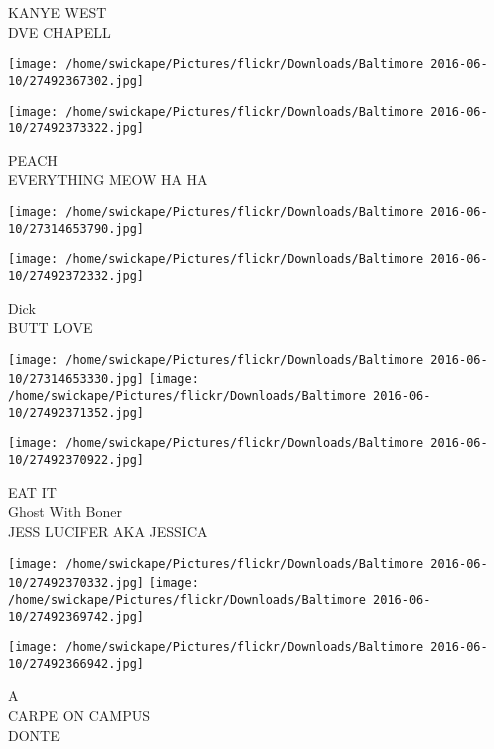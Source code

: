 \documentclass[10pt,letterpaper]{article}
\begin{document}
KANYE WEST\\
DVE CHAPELL\\
\pagebreak

\texttt{[image: /home/swickape/Pictures/flickr/Downloads/Baltimore 2016-06-10/27492367302.jpg]}

\vspace{0.25in}
\texttt{[image: /home/swickape/Pictures/flickr/Downloads/Baltimore 2016-06-10/27492373322.jpg]}

PEACH\\
EVERYTHING MEOW HA HA\\
\pagebreak

\texttt{[image: /home/swickape/Pictures/flickr/Downloads/Baltimore 2016-06-10/27314653790.jpg]}

\vspace{0.25in}
\texttt{[image: /home/swickape/Pictures/flickr/Downloads/Baltimore 2016-06-10/27492372332.jpg]}

Dick\\
BUTT LOVE\\
\pagebreak

\texttt{[image: /home/swickape/Pictures/flickr/Downloads/Baltimore 2016-06-10/27314653330.jpg]}
\texttt{[image: /home/swickape/Pictures/flickr/Downloads/Baltimore 2016-06-10/27492371352.jpg]}

\vspace{0.25in}
\texttt{[image: /home/swickape/Pictures/flickr/Downloads/Baltimore 2016-06-10/27492370922.jpg]}

EAT IT\\
Ghost With Boner\\
JESS LUCIFER AKA JESSICA\\
\pagebreak

\texttt{[image: /home/swickape/Pictures/flickr/Downloads/Baltimore 2016-06-10/27492370332.jpg]}
\texttt{[image: /home/swickape/Pictures/flickr/Downloads/Baltimore 2016-06-10/27492369742.jpg]}

\texttt{[image: /home/swickape/Pictures/flickr/Downloads/Baltimore 2016-06-10/27492366942.jpg]}

A\\
CARPE ON CAMPUS\\
DONTE\\
\pagebreak
\end{document}
